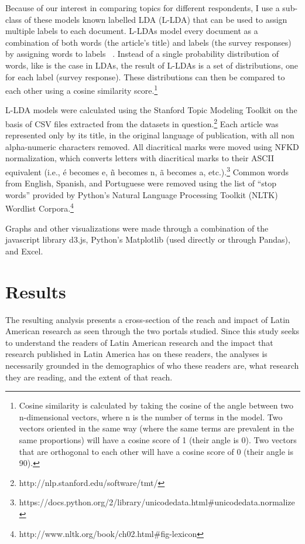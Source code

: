 Because of our interest in comparing topics for different respondents, I use a sub-class of these models known labelled LDA (L-LDA) that can be used to assign multiple labels to each document. L-LDAs model every document as a combination of both words (the article's title) and labels (the survey responses) by assigning words to labels ~\citep{Ramage2009,McFarland2013}. Instead of a single probability distribution of words, like is the case in LDAs, the result of L-LDAs is a set of distributions, one for each label (survey response). These distributions can then be compared to each other using a cosine similarity score.\footnote{Cosine similarity is calculated by taking the cosine of the angle between two n-dimensional vectors, where n is the number of terms in the model. Two vectors oriented in the same way (where the same terms are prevalent in the same proportions) will have a cosine score of 1 (their angle is 0). Two vectors that are orthogonal to each other will have a cosine score of 0 (their angle is 90).}

L-LDA models were calculated using the Stanford Topic Modeling Toolkit on the basis of CSV files extracted from the datasets in question.\footnote{http:\slash \slash nlp.stanford.edu\slash software\slash tmt\slash } Each article was represented only by its title, in the original language of publication, with all non alpha-numeric characters removed. All diacritical marks were moved using NFKD normalization, which converts letters with diacritical marks to their ASCII equivalent (i.e., é becomes e, ñ becomes n, ã becomes a, etc.).\footnote{https:\slash \slash docs.python.org\slash 2\slash library\slash unicodedata.html\#unicodedata.normalize} Common words from English, Spanish, and Portuguese were removed using the list of ``stop words'' provided by Python's Natural Language Processing Toolkit (NLTK) Wordlist Corpora.\footnote{http:\slash \slash www.nltk.org\slash book\slash ch02.html\#fig-lexicon}

Graphs and other visualizations were made through a combination of the javascript library d3.js, Python's Matplotlib (used directly or through Pandas), and Excel.

\chapter{Results}
\label{results}

The resulting analysis presents a cross-section of the reach and impact of Latin American research as seen through the two portals studied. Since this study seeks to understand the readers of Latin American research and the impact that research published in Latin America has on these readers, the analyses is necessarily grounded in the demographics of who these readers are, what research they are reading, and the extent of that reach.


